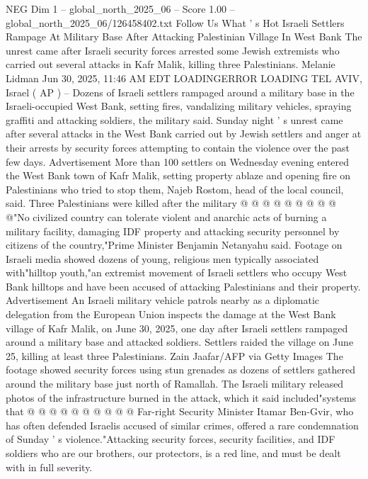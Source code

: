 \begin{textsample}{NEG Dim 1 – global\_north\_2025\_06 – Score 1.00 – global\_north\_2025\_06/126458402.txt}  \label{ex:f1_neg_123}
Follow Us What ' s Hot Israeli Settlers Rampage At Military Base After Attacking Palestinian Village In West Bank The unrest came after Israeli security forces arrested some Jewish extremists who carried out several attacks in Kafr Malik, killing three Palestinians.
Melanie Lidman Jun 30, 2025, 11:46 AM EDT LOADINGERROR LOADING TEL AVIV, Israel ( AP ) -- Dozens of Israeli settlers rampaged around a military base in the Israeli-occupied West Bank, setting fires, vandalizing military vehicles, spraying graffiti and attacking soldiers, the military said.
Sunday night ' s unrest came after several attacks in the West Bank carried out by Jewish settlers and anger at their arrests by security forces attempting to contain the violence over the past few days.
Advertisement More than 100 settlers on Wednesday evening entered the West Bank town of Kafr Malik, setting property ablaze and opening fire on Palestinians who tried to stop them, Najeb Rostom, head of the local council, said.
Three Palestinians were killed after the military @ @ @ @ @ @ @ @ @ @"No civilized country can tolerate violent and anarchic acts of burning a military facility, damaging IDF property and attacking security personnel by citizens of the country,"Prime Minister Benjamin Netanyahu said.
Footage on Israeli media showed dozens of young, religious men typically associated with"hilltop youth,"an extremist movement of Israeli settlers who occupy West Bank hilltops and have been accused of attacking Palestinians and their property.
Advertisement An Israeli military vehicle patrols nearby as a diplomatic delegation from the European Union inspects the damage at the West Bank village of Kafr Malik, on June 30, 2025, one day after Israeli settlers rampaged around a military base and attacked soldiers.
Settlers raided the village on June 25, killing at least three Palestinians.
Zain Jaafar/AFP via Getty Images The footage showed security forces using stun grenades as dozens of settlers gathered around the military base just north of Ramallah.
The Israeli military released photos of the infrastructure burned in the attack, which it said included"systems that @ @ @ @ @ @ @ @ @ @ Far-right Security Minister Itamar Ben-Gvir, who has often defended Israelis accused of similar crimes, offered a rare condemnation of Sunday ' s violence."Attacking security forces, security facilities, and IDF soldiers who are our brothers, our protectors, is a red line, and must be dealt with in full severity.

\end{textsample}

